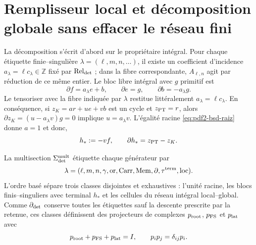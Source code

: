 \section{Remplisseur local et décomposition globale sans effacer le réseau fini}

La décomposition s'écrit d'abord sur le propriétaire intégral. Pour
chaque étiquette finie--singulière $\lambda=(\ell,m,n,\ldots)$, il existe un
coefficient d'incidence $a_\lambda=\ell c_\lambda\in\mathbb Z$ fixé par
$\operatorname{Rel}_{\rm det}$ ; dans la fibre correspondante,
$A_{\ell,n}$ agit par réduction de ce même entier. Le bloc libre
intégral avec $g$ primitif est
\begin{equation}\label{eq:pdf2-bsd-bloque-normal}
 \partial f=a_\lambda e+b,\qquad
 \partial e=g,\qquad
 \partial b=-a_\lambda g.
\end{equation}
Le tensoriser avec la fibre indiquée par $\lambda$ restitue littéralement
$a_\lambda=\ell c_\lambda$. En conséquence, si
$z_K=ar+ue+vb$ est un cycle et $z_{\rm PT}=r$, alors
$\partial z_K=(u-a_\lambda v)g=0$ implique $u=a_\lambda v$. L'égalité racine
\eqref{eq:pdf2-bsd-raiz} donne $a=1$ et donc,
\begin{equation}\label{eq:pdf2-bsd-filler-local}
 h_*:=-vf,\qquad \partial h_*=z_{\rm PT}-z_K.
\end{equation}

La multisection $\Sigma_{\rm det}^{\rm mult}$ étiquette chaque générateur par
\begin{equation}\label{eq:pdf2-bsd-etiqueta-completa}
 \lambda=(\ell,m,n,\gamma,\operatorname{or},\operatorname{Carr},
 \operatorname{Mem},\partial,\tau^{\rm term},\operatorname{loc}).
\end{equation}
L'ordre basé sépare trois classes disjointes et exhaustives : l'unité racine,
les blocs finis--singuliers avec terminal $h_*$ et les cellules du réseau
intégral local--global. Comme $\partial_{\rm det}$ conserve toutes les
étiquettes sauf la descente prescrite par la retenue, ces classes définissent
des projecteurs de complexes $p_{\rm root}$, $p_{\rm FS}$ et $p_{\rm lat}$ avec
\begin{equation}\label{eq:pdf2-bsd-tres-proyectores}
 p_{\rm root}+p_{\rm FS}+p_{\rm lat}=I,
 \qquad p_ip_j=\delta_{ij}p_i.
\end{equation}

